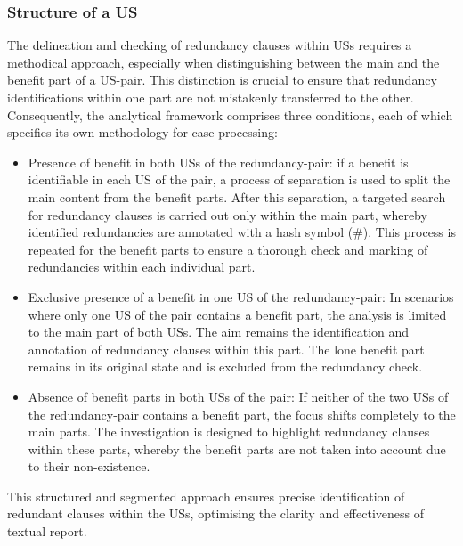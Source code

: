 \subsubsection*{Structure of a US}
The delineation and checking of redundancy clauses within USs requires a methodical approach, especially when distinguishing between the main and the benefit part of a US-pair. This distinction is crucial to ensure that redundancy identifications within one part are not mistakenly transferred to the other. Consequently, the analytical framework comprises three conditions, each of which specifies its own methodology for case processing:
\begin{itemize}
	\item Presence of benefit in both USs of the redundancy-pair: if a benefit is identifiable in each US of the pair, a process of separation is used to split the main content from the benefit parts. After this separation, a targeted search for redundancy clauses is carried out only within the main part, whereby identified redundancies are annotated with a hash symbol (\#). This process is repeated for the benefit parts to ensure a thorough check and marking of redundancies within each individual part.
	
	\item Exclusive presence of a benefit in one US of the redundancy-pair: In scenarios where only one US of the pair contains a benefit part, the analysis is limited to the main part of both USs. The aim remains the identification and annotation of redundancy clauses within this part. The lone benefit part remains in its original state and is excluded from the redundancy check.
	
	\item Absence of benefit parts in both USs of the pair: If neither of the two USs of the redundancy-pair contains a benefit part, the focus shifts completely to the main parts. The investigation is designed to highlight redundancy clauses within these parts, whereby the benefit parts are not taken into account due to their non-existence.
	
\end{itemize}
This structured and segmented approach ensures precise identification of redundant clauses within the USs, optimising the clarity and effectiveness of textual report.
